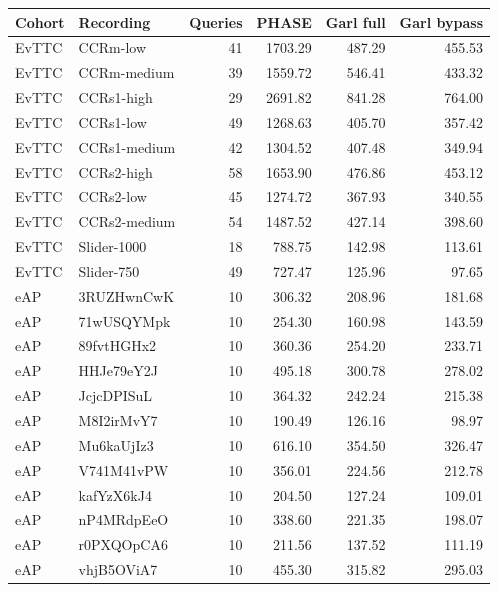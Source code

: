 \begin{tabular}{llrrrr}
\toprule
Cohort & Recording & Queries & PHASE & Garl full & Garl bypass \\
\midrule
EvTTC & CCRm-low & 41 & 1703.29 & 487.29 & 455.53 \\
EvTTC & CCRm-medium & 39 & 1559.72 & 546.41 & 433.32 \\
EvTTC & CCRs1-high & 29 & 2691.82 & 841.28 & 764.00 \\
EvTTC & CCRs1-low & 49 & 1268.63 & 405.70 & 357.42 \\
EvTTC & CCRs1-medium & 42 & 1304.52 & 407.48 & 349.94 \\
EvTTC & CCRs2-high & 58 & 1653.90 & 476.86 & 453.12 \\
EvTTC & CCRs2-low & 45 & 1274.72 & 367.93 & 340.55 \\
EvTTC & CCRs2-medium & 54 & 1487.52 & 427.14 & 398.60 \\
EvTTC & Slider-1000 & 18 & 788.75 & 142.98 & 113.61 \\
EvTTC & Slider-750 & 49 & 727.47 & 125.96 & 97.65 \\
eAP & 3RUZHwnCwK & 10 & 306.32 & 208.96 & 181.68 \\
eAP & 71wUSQYMpk & 10 & 254.30 & 160.98 & 143.59 \\
eAP & 89fvtHGHx2 & 10 & 360.36 & 254.20 & 233.71 \\
eAP & HHJe79eY2J & 10 & 495.18 & 300.78 & 278.02 \\
eAP & JcjcDPISuL & 10 & 364.32 & 242.24 & 215.38 \\
eAP & M8I2irMvY7 & 10 & 190.49 & 126.16 & 98.97 \\
eAP & Mu6kaUjIz3 & 10 & 616.10 & 354.50 & 326.47 \\
eAP & V741M41vPW & 10 & 356.01 & 224.56 & 212.78 \\
eAP & kafYzX6kJ4 & 10 & 204.50 & 127.24 & 109.01 \\
eAP & nP4MRdpEeO & 10 & 338.60 & 221.35 & 198.07 \\
eAP & r0PXQOpCA6 & 10 & 211.56 & 137.52 & 111.19 \\
eAP & vhjB5OViA7 & 10 & 455.30 & 315.82 & 295.03 \\
\bottomrule
\end{tabular}
